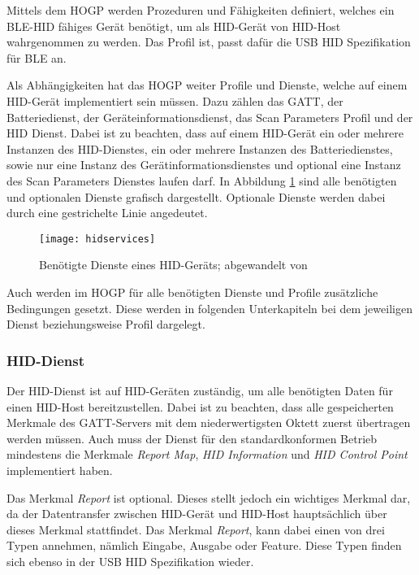 Mittels dem \acl{HOGP} werden Prozeduren und Fähigkeiten definiert, welches ein \acs{BLE}-\acs{HID} fähiges Gerät benötigt, um als \acs{HID}-Gerät von \acs{HID}-Host wahrgenommen zu werden. Das Profil ist, passt dafür die USB \acs{HID} Spezifikation für \ac{BLE} an. \cite[S.~9]{bluetoothHOGP}

Als Abhängigkeiten hat das \acf{HOGP} weiter Profile und Dienste, welche auf einem \acs{HID}-Gerät implementiert sein müssen. Dazu zählen das \acs{GATT}, der Batteriedienst, der Geräteinformationsdienst, das Scan Parameters Profil und der \acs{HID} Dienst. Dabei ist zu beachten, dass auf einem \acs{HID}-Gerät ein oder mehrere Instanzen des \acs{HID}-Dienstes, ein oder mehrere Instanzen des Batteriedienstes, sowie nur eine Instanz des Gerätinformationsdienstes und optional eine Instanz des Scan Parameters Dienstes laufen darf. \cite[S.~9, S.~11]{bluetoothHOGP} In Abbildung \ref{fig:hidservices} sind alle benötigten und optionalen Dienste grafisch dargestellt. Optionale Dienste werden dabei durch eine gestrichelte Linie angedeutet.

\begin{figure}[h]
    \centering
    \texttt{[image: hidservices]}
    \caption{Benötigte Dienste eines \acs{HID}-Geräts; abgewandelt von \cite[S.~11]{bluetoothHOGP}}
    \label{fig:hidservices}
\end{figure}

Auch werden im \acl{HOGP} für alle benötigten Dienste und Profile zusätzliche Bedingungen gesetzt. Diese werden in folgenden Unterkapiteln bei dem jeweiligen Dienst beziehungsweise Profil dargelegt.

\subsubsection{\ac{HID}-Dienst}

Der \acs{HID}-Dienst ist auf \acs{HID}-Geräten zuständig, um alle benötigten Daten für einen \acs{HID}-Host bereitzustellen. Dabei ist zu beachten, dass alle gespeicherten Merkmale des \acs{GATT}-Servers mit dem niederwertigsten Oktett zuerst übertragen werden müssen. Auch muss der Dienst für den standardkonformen Betrieb mindestens die Merkmale \textit{Report Map}, \textit{HID Information} und \textit{HID Control Point} implementiert haben. \cite[S.~8ff.]{bluetoothHIDS}

Das Merkmal \textit{Report} ist optional. Dieses stellt jedoch ein wichtiges Merkmal dar, da der Datentransfer zwischen \acs{HID}-Gerät und \acs{HID}-Host hauptsächlich über dieses Merkmal stattfindet. Das Merkmal \textit{Report}, kann dabei einen von drei Typen annehmen, nämlich Eingabe, Ausgabe oder Feature. Diese Typen finden sich ebenso in der USB \acs{HID} Spezifikation wieder. \cite[S.~11f.]{bluetoothHIDS}

